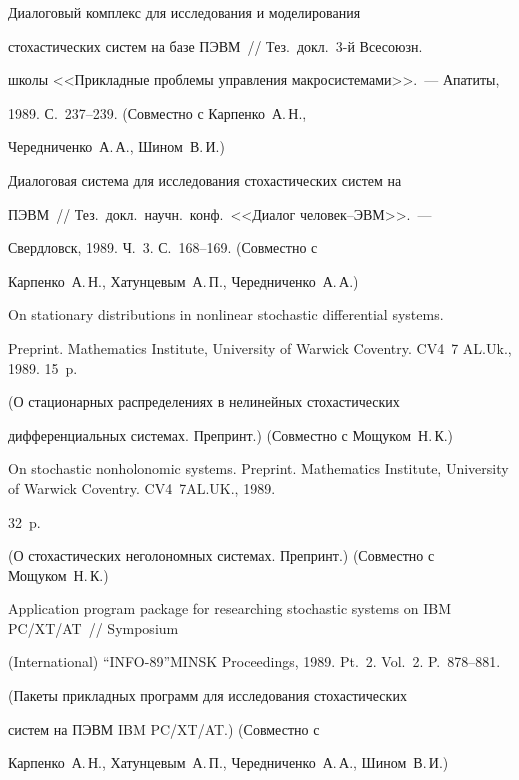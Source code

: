  Диалоговый комплекс для исследования и моделирования\linebreak


стохастических систем на базе ПЭВМ~// Тез.\ докл.\ 3-й Все\-со\-юзн.\


школы <<Прикладные проблемы управления макросистемами>>.~--- Апатиты,


1989. С.~237--239. (Совместно с Кар\-пен\-ко~А.\,Н.,


Чередниченко~А.\,А., Шином~В.\,И.)





 Диалоговая система для исследования стохастических систем на


ПЭВМ~// Тез.\ докл.\ научн.\ конф.\ <<Диалог человек--ЭВМ>>.~---


Свердловск, 1989. Ч.~3. С.~168--169. (Совместно с


Кар\-пен\-ко~А.\,Н., Хатунцевым~А.\,П., Чередниченко~А.\,А.)





On stationary distributions in nonlinear stochastic differential systems.


Preprint. Mathematics Institute, University of Warwick Coventry. CV4~7 AL.Uk., 1989. 15~p.


 (О стационарных распределениях в нелинейных стохастических


дифференциальных системах. Препринт.) (Совместно с Мощуком~Н.\,К.)





On stochastic nonholonomic systems. Preprint. Mathematics Institute, University of Warwick Coventry. CV4~7AL.UK., 1989.


32~p.


(О стохастических неголономных системах. Препринт.) (Совместно с Мощуком~Н.\,К.)





Application program package for researching stochastic systems on IBM PC/XT/AT~// Symposium


(International) ``INFO-89''\linebreak MINSK Proceedings, 1989. Pt.~2. Vol.~2. P.~878--881.


(Пакеты прикладных программ для исследования стохастических


систем на ПЭВМ IBM PC/XT/AT.) (Совместно с


Карпенко~А.\,Н., Хатунцевым~А.\,П., Чередниченко~А.\,А., Шином~В.\,И.)





